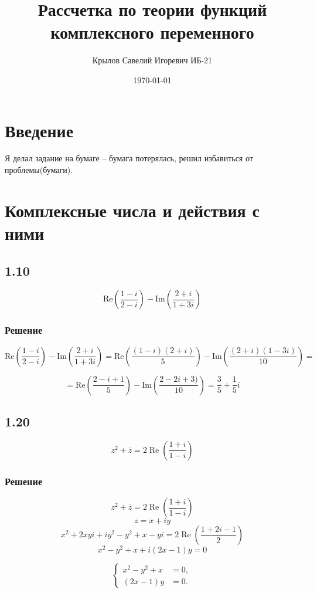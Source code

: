 \documentclass[12pt,a4paper]{article}
\title{Рассчетка по теории функций комплексного переменного}
\author{Крылов Савелий Игоревич ИБ-21}
\date{\today}
\begin{document}
\maketitle
\newpage

\renewcommand{\contentsname}{Содержание}
\tableofcontents
\newpage

\section*{Введение}
Я делал задание на бумаге -- бумага потерялась, решил избавиться от проблемы(бумаги).

\section{Комплексные числа и действия с ними}
\subsection*{1.10}
\[
\text{Re} \left( \frac{1 - i}{2 - i} \right) - \text{Im} \left( \frac{2 + i}{1 + 3i} \right)
\]
\subsubsection*{Решение}
\[
\text{Re} \left( \frac{1-i}{2-i} \right) - \text{Im} \left( \frac{2+i}{1+3i} \right) = \text{Re} \left( \frac{(1-i)(2+i)}{5} \right) - \text{Im} \left( \frac{(2+i)(1-3i)}{10} \right) =
\]

\[
= \text{Re} \left( \frac{2-i+1}{5} \right) - \text{Im} \left( \frac{2-2i+3)}{10} \right) = \frac{3}{5}+\frac{1}{5}i
\]
\subsection*{1.20}
\[
z^2 + \overline{z} = 2\operatorname{Re} \left( \frac{1 + i}{1 - i} \right)
\]
\subsubsection*{Решение}
\[
z^2 + \overline{z} = 2 \operatorname{Re} \left( \frac{1+i}{1-i} \right)
\]
\[
z = x + iy
\]
\[
x^2 + 2xyi + iy^2 - y^2 + x - yi = 2 \operatorname{Re} \left( \frac{1+2i-1}{2} \right)
\]
\[
x^2 - y^2 + x + i(2x-1)y = 0
\]

\[
\left\{
\begin{aligned}
x^2 - y^2 + x &= 0, \\
(2x - 1) y &= 0.
\end{aligned}
\right.
\]
\end{document}
